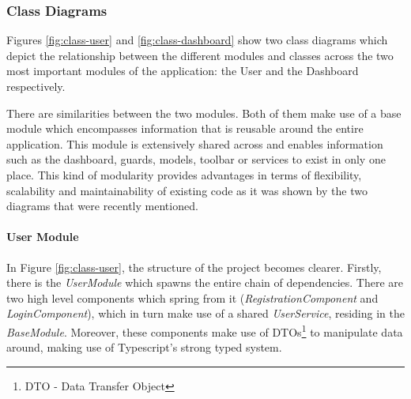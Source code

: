 \documentclass[multi, tikz, a4paper, oneside]{article}
\begin{document}
\subsubsection{Class Diagrams}
Figures \ref{fig:class-user} and \ref{fig:class-dashboard} show two class
diagrams which depict the relationship between the different modules and classes
across the two most important modules of the application: the User and the
Dashboard respectively.

There are similarities between the two modules. Both of them make use of a base
module which encompasses information that is reusable around the entire
application. This module is extensively shared across and enables information
such as the dashboard, guards, models, toolbar or services to exist in only one
place. This kind of modularity provides advantages in terms of flexibility,
scalability and maintainability of existing code as it was shown by the two
diagrams that were recently mentioned.

\paragraph{User Module}
In Figure \ref{fig:class-user}, the structure of the project becomes clearer.
Firstly, there is the {\em{UserModule}} which spawns the entire chain of
dependencies. There are two high level components which spring from it
({\em{RegistrationComponent}} and {\em{LoginComponent}}), which in turn make use
of a shared {\em{UserService}}, residing in the {\em{BaseModule}}. Moreover,
these components make use of DTOs\footnote{DTO - Data Transfer Object} to
manipulate data around, making use of Typescript's strong typed system.
\end{document}
